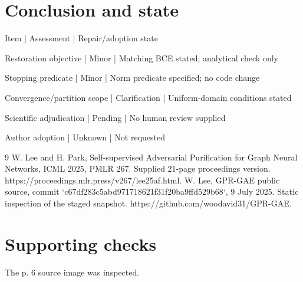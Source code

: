 \documentclass[10pt]{article}
\begin{document}
\section*{Conclusion and state}
Item | Assessment | Repair/adoption state\par
Restoration objective | Minor | Matching BCE stated; analytical check only\par
Stopping predicate | Minor | Norm predicate specified; no code change\par
Convergence/partition scope | Clarification | Uniform-domain conditions stated\par
Scientific adjudication | Pending | No human review supplied\par
Author adoption | Unknown | Not requested\par
9 W. Lee and H. Park, Self-supervised Adversarial Purification for Graph Neural Networks, ICML 2025, PMLR 267. Supplied 21-page proceedings version. https://proceedings.mlr.press/v267/lee25af.html. W. Lee, GPR-GAE public source, commit `c67df283c5abd971718621f31f20ba9ffd529b68`, 9 July 2025. Static inspection of the staged snapshot. https://github.com/woodavid31/GPR-GAE.\par
\section*{Supporting checks}
The p. 6 source image was inspected.\par
\end{document}
